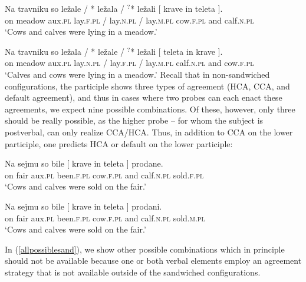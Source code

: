 \documentclass[output=paper
,modfonts
,nonflat]{langsci/langscibook}
\begin{document}
\ea \label{postverbal}
\gll Na travniku so ležale / * ležala  / $^?$* ležali [ krave in teleta ].\\
on meadow aux.\textsc{pl} lay.\textsc{f.pl} / {} lay.\textsc{n.pl} / {} lay.\textsc{m.pl} {} cow.\textsc{f.pl} and calf.\textsc{n.pl} {} \\
\glt `Cows and calves were lying in a meadow.'
\z


\ea \gll Na travniku so ležala / * ležale / $^?$* ležali [ teleta in krave ].\\
on meadow aux.\textsc{pl} lay.\textsc{n.pl} / {} lay.\textsc{f.pl} / {} lay.\textsc{m.pl} {} calf.\textsc{n.pl} and cow.\textsc{f.pl} {} \\
\glt `Calves and cows were lying in a meadow.'
\z
Recall that in non-sandwiched configurations, the participle shows three types of agreement (HCA, CCA, and default agreement), and thus in cases where two probes can each enact these agreements, we expect nine possible combinations. Of these, however, only three should be really possible, as the higher probe -- for whom the subject is postverbal, can only realize CCA/HCA. Thus, in addition to CCA on the lower participle, one predicts HCA or default on the lower participle:

\begin{exe}
\ex
\begin{xlist}
\ex \label{allhcahca}\gll Na sejmu so bile [ krave in teleta ] prodane.\\
on fair aux.\textsc{pl} been.\textsc{f.pl} {} cow.\textsc{f.pl} and calf.\textsc{n.pl} {} sold.\textsc{f.pl}\\
\glt `Cows and calves were sold on the fair.'

\ex \label{allhcadef}\gll Na sejmu so bile [ krave in teleta ] prodani.\\
on fair aux.\textsc{pl} been.\textsc{f.pl} {} cow.\textsc{f.pl} and calf.\textsc{n.pl} {} sold.\textsc{m.pl} \\
\glt `Cows and calves were sold on the fair.'
\end{xlist}
\end{exe}
In (\ref{allpossiblesand}), we show other possible combinations which in principle should not be available because one or both verbal elements employ an agreement strategy that is not available outside of the sandwiched configurations. 
\end{document}
